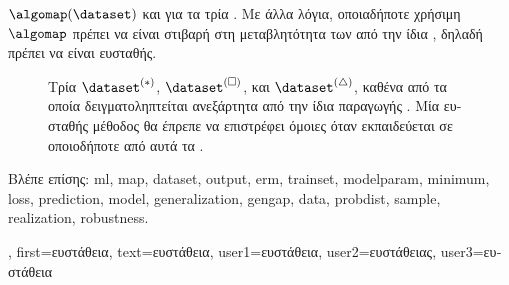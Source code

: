 {{		$\algomap(\dataset)$ \foreignlanguage{greek}{και για τα τρία} . \foreignlanguage{greek}{Με άλλα λόγια, οποιαδήποτε 
		χρήσιμη $\algomap$ πρέπει να είναι στιβαρή στη μεταβλητότητα των}   
		\foreignlanguage{greek}{από την ίδια} , \foreignlanguage{greek}{δηλαδή πρέπει να είναι ευσταθής}. 
		\begin{figure}[H]
			\centering
		{
		\caption{\foreignlanguage{greek}{Τρία}  $\dataset^{(*)}$, $\dataset^{(\square)}$, \foreignlanguage{greek}{και 
			$\dataset^{(\triangle)}$, καθένα από τα οποία δειγματοληπτείται ανεξάρτητα από την ίδια}  
			\foreignlanguage{greek}{παραγωγής} . \foreignlanguage{greek}{Μία ευσταθής μέθοδος}  
			\foreignlanguage{greek}{θα έπρεπε να επιστρέφει όμοιες}  \foreignlanguage{greek}{όταν εκπαιδεύεται σε 
			οποιοδήποτε από αυτά τα} . \label{fig_three_data_stability_dict}} }
		\end{figure}
		\foreignlanguage{greek}{Βλέπε επίσης:} \gls{ml}, \gls{map}, \gls{dataset}, \gls{output}, \gls{erm}, \gls{trainset}, \gls{modelparam}, \gls{minimum}, 
		\gls{loss}, \gls{prediction}, \gls{model}, \gls{generalization}, \gls{gengap}, \gls{data}, \gls{probdist}, \gls{sample}, \gls{realization}, \gls{robustness}. }, 
	first={\foreignlanguage{greek}{ευστάθεια}}, 
	text={\foreignlanguage{greek}{ευστάθεια}},
	user1={\foreignlanguage{greek}{ευστάθεια}}, %
  	user2={\foreignlanguage{greek}{ευστάθειας}}, %
	user3={\foreignlanguage{greek}{ευστάθεια}} %
}

